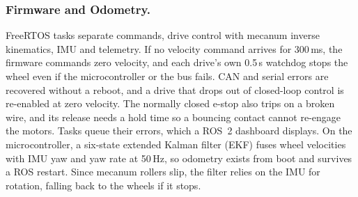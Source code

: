 \subsubsection{Firmware and Odometry.}
FreeRTOS tasks separate commands, drive control with mecanum inverse kinematics, IMU and telemetry. If no velocity command arrives for 300\,ms, the firmware commands zero velocity, and each drive's own 0.5\,s watchdog stops the wheel even if the microcontroller or the bus fails. CAN and serial errors are recovered without a reboot, and a drive that drops out of closed-loop control is re-enabled at zero velocity. The normally closed e-stop also trips on a broken wire, and its release needs a hold time so a bouncing contact cannot re-engage the motors. Tasks queue their errors, which a ROS~2 dashboard displays. On the microcontroller, a six-state extended Kalman filter (EKF) fuses wheel velocities with IMU yaw and yaw rate at 50\,Hz, so odometry exists from boot and survives a ROS restart. Since mecanum rollers slip, the filter relies on the IMU for rotation, falling back to the wheels if it stops.